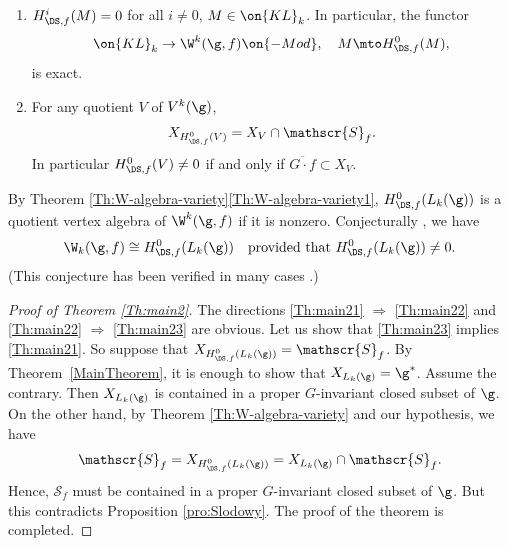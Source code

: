 \skpt
\begin{theorem}
\label{Th:W-algebra-variety}
\begin{enumerate}
\item\label{Th:W-algebra-variety1} $H_{\DS,f}^i(M)=0$ for all $i\ne 0$, $M\in
\on{KL}_k$.
In particular, the functor
\[
\on{KL}_k\to\W^k(\g,f)\on{-Mod},\quad M\mto
H_{\DS,f}^{0}(M),
\]
is exact.
\item\label{Th:W-algebra-variety2}
For any quotient $V$ of $V^k(\g)$,
\begin{equation*}
X_{H^{0}_{\DS,f}(V)}=X_{V}\cap \mathscr{S}_{f}.
\end{equation*}
In particular
$H_{\DS,f}^{0}(V)
\ne 0$ if and only if
$\overline{G\cdot f}\subset X_V$.
\label{item:intersection}
\end{enumerate}
\end{theorem}

By Theorem \ref{Th:W-algebra-variety}\eqref{Th:W-algebra-variety1},
$H^{0}_{\DS,f}(L_k(\g))$ is a quotient vertex algebra of $\W^k(\g,f)$ if it is nonzero.
Conjecturally \cite{KacRoaWak03,KacWak08},
we have
\begin{equation*}
\W_k(\g,f)\cong H^{0}_{\DS,f}(L_k(\g))\quad\text{provided that }H^{0}_{\DS,f}(L_k(\g))\ne 0.
\end{equation*}
(This conjecture has been verified in many cases \cite{Ara05,Ara07,Ara08-a,AEkeren19}.)

\begin{proof}[Proof of Theorem \ref{Th:main2}]
The directions \eqref{Th:main21} $\Rightarrow$ \eqref{Th:main22}
and \eqref{Th:main22} $\Rightarrow$ \eqref{Th:main23} are obvious.
Let us show that \eqref{Th:main23} implies \eqref{Th:main21}.
So suppose that $X_{H^{0}_{\DS,f}(L_k(\g))}=\mathscr{S}_f$.
By Theorem~\ref{MainTheorem}, it is enough to show that $X_{L_k(\g)}=\g^*$.
Assume the contrary. Then $X_{L_k(\g)}$ is contained in a proper
$G$-invariant closed subset of $\g$.
On the other hand, by Theorem \ref{Th:W-algebra-variety} and our hypothesis,
we have
\[
\mathscr{S}_f=X_{H^{0}_{\DS,f}(L_k(\g))}= X_{L_k(\g)} \cap \mathscr{S}_f.
\]
Hence, $ \mathscr{S}_f$ must be contained
in a proper
$G$-invariant closed subset of $\g$. But this contradicts Proposition \ref{pro:Slodowy}.
The proof of the theorem is completed.
\end{proof}

